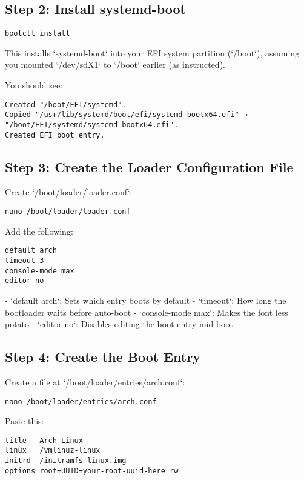 \documentclass[12pt]{book}
\begin{document}
\subsection*{Step 2: Install systemd-boot}

\begin{lstlisting}
bootctl install
\end{lstlisting}

This installs `systemd-boot` into your EFI system partition (`/boot`), assuming you mounted `/dev/sdX1` to `/boot` earlier (as instructed).

You should see:

\begin{lstlisting}
Created "/boot/EFI/systemd".
Copied "/usr/lib/systemd/boot/efi/systemd-bootx64.efi" → "/boot/EFI/systemd/systemd-bootx64.efi".
Created EFI boot entry.
\end{lstlisting}

\subsection*{Step 3: Create the Loader Configuration File}

Create `/boot/loader/loader.conf`:

\begin{lstlisting}
nano /boot/loader/loader.conf
\end{lstlisting}

Add the following:

\begin{lstlisting}
default arch
timeout 3
console-mode max
editor no
\end{lstlisting}

- `default arch`: Sets which entry boots by default
- `timeout`: How long the bootloader waits before auto-boot
- `console-mode max`: Makes the font less potato
- `editor no`: Disables editing the boot entry mid-boot

\subsection*{Step 4: Create the Boot Entry}

Create a file at `/boot/loader/entries/arch.conf`:

\begin{lstlisting}
nano /boot/loader/entries/arch.conf
\end{lstlisting}

Paste this:

\begin{lstlisting}
title   Arch Linux
linux   /vmlinuz-linux
initrd  /initramfs-linux.img
options root=UUID=your-root-uuid-here rw
\end{lstlisting}
\end{document}
